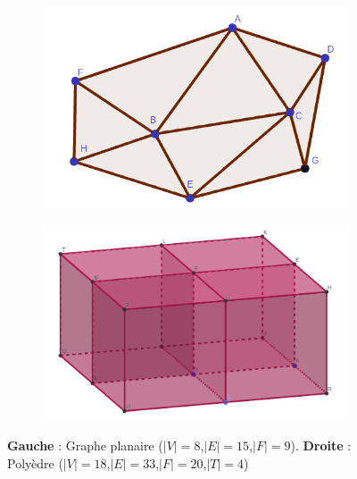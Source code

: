 \begin{figure}[th]
\centering
\begin{subfigure}{.5\textwidth}
  \centering
  \includegraphics[scale=0.3]{Images/planar_graph}
\end{subfigure}%
\begin{subfigure}{.5\textwidth}
  \centering
  \includegraphics[scale=0.18]{Images/4cubes}
\end{subfigure}
\caption{\textbf{Gauche} : Graphe planaire ($|V|=8$,$|E|=15$,$|F|=9$). \textbf{Droite} : Polyèdre ($|V|=18$,$|E|=33$,$|F|=20$,$|T|=4$)}
\label{fig:planar_graph_4cubes}
\end{figure}
\noindent


